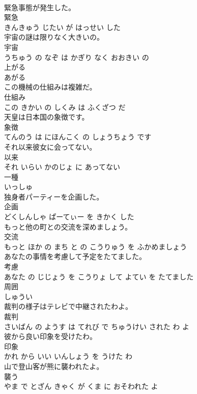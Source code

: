 \documentclass[8pt]{extreport}
\begin{document}
\begin{CJK}{UTF8}{min}
\\	緊急事態が発生した。	
\\	緊急 
\\	きんきゅう じたい が はっせい した			
\\	宇宙の謎は限りなく大きいの。	
\\	宇宙 
\\	うちゅう の なぞ は かぎり なく おおきい の			
\\	上がる	
\\	あがる			
\\	この機械の仕組みは複雑だ。	
\\	仕組み 
\\	この きかい の しくみ は ふくざつ だ			
\\	天皇は日本国の象徴です。	
\\	象徴 
\\	てんのう は にほんこく の しょうちょう です			
\\	それ以来彼女に会ってない。	
\\	以来 
\\	それ いらい かのじょ に あってない			
\\	一種	
\\	いっしゅ			
\\	独身者パーティーを企画した。	
\\	企画 
\\	どくしんしゃ ぱーてぃー を きかく した			
\\	もっと他の町との交流を深めましょう。	
\\	交流 
\\	もっと ほか の まち と の こうりゅう を ふかめましょう			
\\	あなたの事情を考慮して予定をたてました。	
\\	考慮 
\\	あなた の じじょう を こうりょ して よてい を たてました			
\\	周囲	
\\	しゅうい			
\\	裁判の様子はテレビで中継されたわよ。	
\\	裁判 
\\	さいばん の ようす は てれび で ちゅうけい された わ よ			
\\	彼から良い印象を受けたわ。	
\\	印象 
\\	かれ から いい いんしょう を うけた わ			
\\	山で登山客が熊に襲われたよ。	
\\	襲う 
\\	やま で とざん きゃく が くま に おそわれた よ			

\end{CJK}
\end{document}
